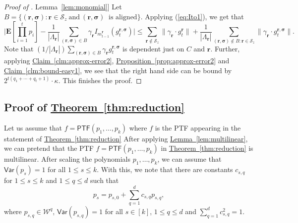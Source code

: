 \documentclass[11pt]{article}
\numberwithin{equation}{section}
\theoremstyle{definition}
\theoremstyle{plain}
\newcommand{\expref}[2]{\hyperref[#2]{#1~\ref{#2}}}
\begin{document}
\begin{proof}[Proof of \expref{Lemma}{lem:monomial}]
Let $B = \{(\mathbf{r}, \boldsymbol{\sigma}): \mathbf{r} \in \mathcal{S}_z \ \textrm{and} \ (\mathbf{r}, \boldsymbol{\sigma}) \ \textrm{ is aligned}\}$.
Applying (\ref{eq:Ito1}), we get that
\[
    \bigg| \mathbf{E}[\prod_{i=1}^t p_i] - \frac{1}{|\Lambda_{\mathbf{r}}|}\sum_{(\mathbf{r}, \boldsymbol{\sigma}) \in B} \gamma_{\mathbf{r}} I_{m_{t-1}^{\mathbf{r}}}(g^{\mathbf{r}, \boldsymbol{\sigma}}_{t})\bigg| \leq
\sum_{\mathbf{r} \not \in \mathcal{S}_z} \|\gamma_{\mathbf{r}} \cdot
g^{\mathbf{r}}_{t} \| +  \frac{1}{|\Lambda_{\mathbf{r}}|}\sum_{(\mathbf{r},
\boldsymbol{\sigma}) \not \in B :\mathbf{r} \in \mathcal{S}_z}
\|\gamma_{\mathbf{r}} \cdot g^{\mathbf{r}, \boldsymbol{\sigma}}_{t} \|.
\]
Note that $({1}/{|\Lambda_{\mathbf{r}}|}) \sum_{(\mathbf{r}, \boldsymbol{\sigma}) \in B} \gamma_{\mathbf{r}} g^{\mathbf{r}, \boldsymbol{\sigma}}_{t}$ is dependent just on $C$ and $\mathbf{r}$. Further, applying \expref{Claim}{clm:approx-error2}, \expref{Proposition}{prop:approx-error2} and \expref{Claim}{clm:bound-easy1}, we see that the right hand side can be bound by
$2^{t(q_1 + \cdots + q_t +1)} \cdot \kappa$. This finishes the proof. 
\end{proof}


\subsection{Proof of \expref{Theorem}{thm:reduction}}
Let us assume that $f= \mathsf{PTF}(p_1, \ldots, p_k)$ 
where $f$ is the PTF appearing in the statement of \expref{Theorem}{thm:reduction}
After applying \expref{Lemma}{lem:multilinear}, we can pretend that the PTF $f =  \mathsf{PTF}(p_1, \ldots, p_k)$ in \expref{Theorem}{thm:reduction} is multilinear. 
After scaling the polynomials $p_1, \ldots, p_k$,  we can assume that $\mathsf{Var}(p_s)=1$ for all $1 \le s \le k$. With this, we note that there are constants $c_{s,q}$ for $1 \le s \le k$ and $1 \le q \le d$ such that 
\[
p_{s} = p_{s,0} + \sum_{q=1}^d c_{s,q} p_{s,q}, 
\]
where $p_{s,q} \in \mathcal{W}^q$, $\mathsf{Var}(p_{s,q}) =1$ for all $s \in [k]$, $1 \le q \le d$ and $\sum_{q=1}^d c_{s,q}^2=1$. 
\end{document}
